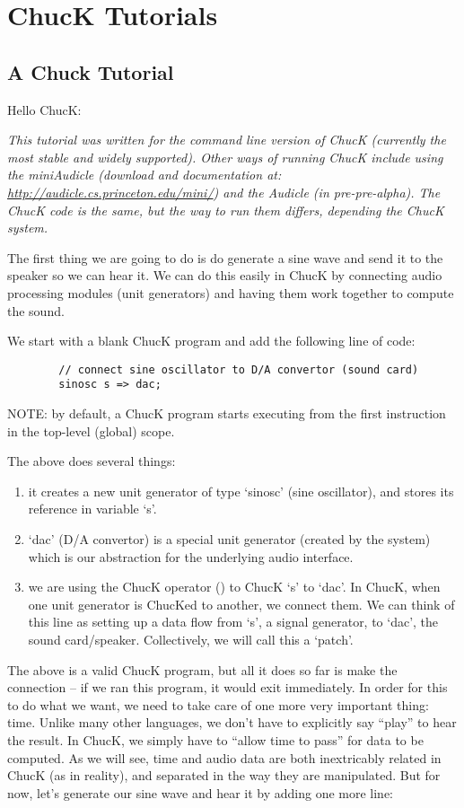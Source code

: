 \chapter{ChucK Tutorials}

\section{A Chuck Tutorial}
Hello ChucK: 

\textit{This tutorial was written for the command line version of ChucK (currently the most stable and widely supported).  Other ways of running ChucK include using the miniAudicle (download and documentation at: \href{http://audicle.cs.princeton.edu/mini/}{http://audicle.cs.princeton.edu/mini/}) and the Audicle (in pre-pre-alpha).  The ChucK code is the same, but the way to run them differs, depending the ChucK system.}

The first thing we are going to do is do generate a sine wave and send it to the speaker so we can hear it. We can do this easily in ChucK by connecting audio processing modules (unit generators) and having them work together to compute the sound. 

We start with a blank ChucK program and add the following line of code:
\begin{verbatim}
        // connect sine oscillator to D/A convertor (sound card)
        sinosc s => dac;
\end{verbatim}

NOTE: by default, a ChucK program starts executing from the first instruction in the top-level (global) scope.

The above does several things:
\begin{enumerate}
\item it creates a new unit generator of type `sinosc' (sine oscillator), and stores its reference in variable `s'.
\item `dac' (D/A convertor) is a special unit generator (created by the system) which is our abstraction for the underlying audio interface.
\item we are using the ChucK operator (\chuckop) to ChucK `s' to `dac'. In ChucK, when one unit generator is ChucKed to another, we connect them. We can think of this line as setting up a data flow from `s', a signal generator, to `dac', the sound card/speaker. Collectively, we will call this a `patch'. 
\end{enumerate}

The above is a valid ChucK program, but all it does so far is make the connection -- if we ran this program, it would exit immediately. In order for this to do what we want, we need to take care of one more very important thing: time. Unlike many other languages, we don't have to explicitly say ``play'' to hear the result. In ChucK, we simply have to ``allow time to pass'' for data to be computed. As we will see, time and audio data are both inextricably related in ChucK (as in reality), and separated in the way they are manipulated. But for now, let's generate our sine wave and hear it by adding one more line:

